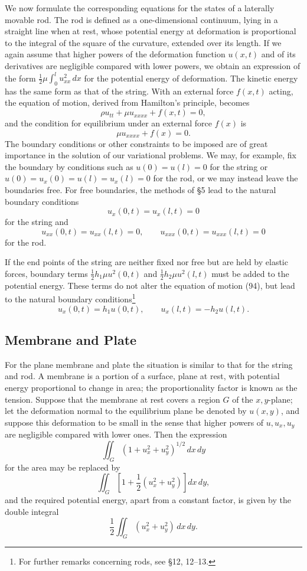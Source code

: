 We now formulate the corresponding equations for the states of a laterally movable rod. The rod is defined as a one-dimensional continuum, lying in a straight line when at rest, whose potential energy at deformation is proportional to the integral of the square of the curvature, extended over its length. If we again assume that higher powers of the deformation function $u(x,t)$ and of its derivatives are negligible compared with lower powers, we obtain an expression of the form $\frac12\mu\int_0^l u_{xx}^2\,dx$ for the potential energy of deformation. The kinetic energy has the same form as that of the string. With an external force $f(x,t)$ acting, the equation of motion, derived from Hamilton's principle, becomes
\[
\rho u_{tt}+\mu u_{xxxx}+f(x,t)=0,
\]
and the condition for equilibrium under an external force $f(x)$ is
\[
\mu u_{xxxx}+f(x)=0.
\]
The boundary conditions or other constraints to be imposed are of great importance in the solution of our variational problems. We may, for example, fix the boundary by conditions such as $u(0)=u(l)=0$ for the string or $u(0)=u_x(0)=u(l)=u_x(l)=0$ for the rod, or we may instead leave the boundaries free. For free boundaries, the methods of \S5 lead to the natural boundary conditions
\begin{equation}\tag{95}
u_x(0,t)=u_x(l,t)=0
\end{equation}
for the string and
\begin{equation}\tag{96}
u_{xx}(0,t)=u_{xx}(l,t)=0,\qquad u_{xxx}(0,t)=u_{xxx}(l,t)=0
\end{equation}
for the rod.

If the end points of the string are neither fixed nor free but are held by elastic forces, boundary terms $\frac12h_1\mu u^2(0,t)$ and $\frac12h_2\mu u^2(l,t)$ must be added to the potential energy. These terms do not alter the equation of motion (94), but lead to the natural boundary conditions\footnote{For further remarks concerning rods, see \S12, 12--13.}
\[
u_x(0,t)=h_1u(0,t),\qquad u_x(l,t)=-h_2u(l,t).
\]

\subsection{Membrane and Plate}
For the plane membrane and plate the situation is similar to that for the string and rod. A membrane is a portion of a surface, plane at rest, with potential energy proportional to change in area; the proportionality factor is known as the tension. Suppose that the membrane at rest covers a region $G$ of the $x,y$-plane; let the deformation normal to the equilibrium plane be denoted by $u(x,y)$, and suppose this deformation to be small in the sense that higher powers of $u,u_x,u_y$ are negligible compared with lower ones. Then the expression
\[
\iint_G(1+u_x^2+u_y^2)^{1/2}\,dx\,dy
\]
for the area may be replaced by
\[
\iint_G\left[1+\frac12(u_x^2+u_y^2)\right]dx\,dy,
\]
and the required potential energy, apart from a constant factor, is given by the double integral
\begin{equation}\tag{97}
\frac12\iint_G(u_x^2+u_y^2)\,dx\,dy.
\end{equation}

